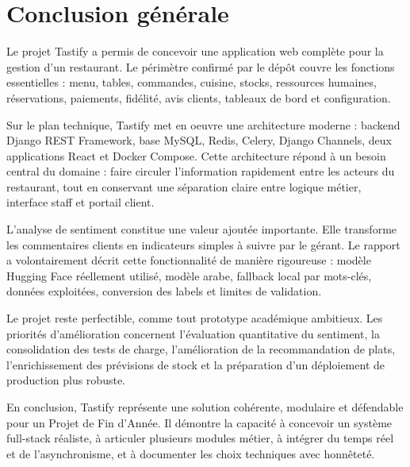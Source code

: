 \chapter*{Conclusion générale}
\label{chap:conclusion}

Le projet Tastify a permis de concevoir une application web complète pour la gestion d'un restaurant. Le périmètre confirmé par le dépôt couvre les fonctions essentielles : menu, tables, commandes, cuisine, stocks, ressources humaines, réservations, paiements, fidélité, avis clients, tableaux de bord et configuration.

Sur le plan technique, Tastify met en oeuvre une architecture moderne : backend Django REST Framework, base MySQL, Redis, Celery, Django Channels, deux applications React et Docker Compose. Cette architecture répond à un besoin central du domaine : faire circuler l'information rapidement entre les acteurs du restaurant, tout en conservant une séparation claire entre logique métier, interface staff et portail client.

L'analyse de sentiment constitue une valeur ajoutée importante. Elle transforme les commentaires clients en indicateurs simples à suivre par le gérant. Le rapport a volontairement décrit cette fonctionnalité de manière rigoureuse : modèle Hugging Face réellement utilisé, modèle arabe, fallback local par mots-clés, données exploitées, conversion des labels et limites de validation.

Le projet reste perfectible, comme tout prototype académique ambitieux. Les priorités d'amélioration concernent l'évaluation quantitative du sentiment, la consolidation des tests de charge, l'amélioration de la recommandation de plats, l'enrichissement des prévisions de stock et la préparation d'un déploiement de production plus robuste.

En conclusion, Tastify représente une solution cohérente, modulaire et défendable pour un Projet de Fin d'Année. Il démontre la capacité à concevoir un système full-stack réaliste, à articuler plusieurs modules métier, à intégrer du temps réel et de l'asynchronisme, et à documenter les choix techniques avec honnêteté.
